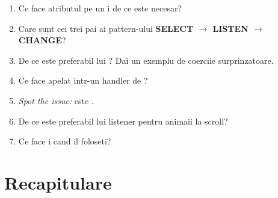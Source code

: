 \begin{selfcheck}
\begin{enumerate}[itemsep=2pt]
  \item Ce face atributul  pe un  i de ce este necesar?
  \item Care sunt cei trei pai ai pattern-ului \textbf{SELECT $\to$ LISTEN $\to$ CHANGE}?
  \item De ce \code{===} este preferabil lui \code{==}? Dai un exemplu de coerciie surprinzatoare.
  \item Ce face  apelat intr-un handler de ?
  \item \emph{Spot the issue:}  \textendash{}  este .
  \item De ce este  preferabil lui  listener pentru animaii la scroll?
  \item Ce face  i cand il foloseti?
\end{enumerate}
\end{selfcheck}

\section*{Recapitulare}

